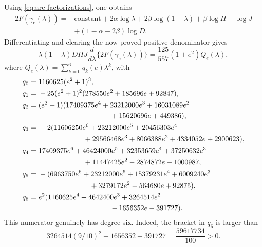 \documentclass[11pt,reqno,letterpaper]{amsart}
\numberwithin{equation}{section}
\theoremstyle{definition}
\theoremstyle{remark}
\begin{document}
Using \eqref{eq:arc-factorizations}, one obtains
\[
 \begin{split}
 2F(\gamma_e(\lambda))={}&\text{constant}
 +2\alpha\log\lambda+2\beta\log(1-\lambda)
 +\beta\log H-\log J\\
 &+(1-\alpha-2\beta)\log D.
 \end{split}
\]
Differentiating and clearing the now-proved positive denominator gives
\begin{equation}\label{eq:exact-phase-derivative}
 \lambda(1-\lambda)DHJ
 \frac d{d\lambda}\{2F(\gamma_e(\lambda))\}
 =\frac{125}{557}(1+e^2)Q_e(\lambda),
\end{equation}
where \(Q_e(\lambda)=\sum_{k=0}^6q_k(e)\lambda^k\), with
\begin{align*}
 q_0={}&1160625(e^2+1)^3,\\
 q_1={}&-25(e^2+1)^2(278550e^2+185696e+92847),\\
 q_2={}&(e^2+1)(17409375e^4+23212000e^3+16031089e^2\\
 &\hspace{35mm}+15620696e+449386),\\
 q_3={}&-2(11606250e^6+23212000e^5+20456303e^4\\
 &\hspace{22mm}+29566468e^3+8066388e^2+4334052e+2900623),\\
 q_4={}&17409375e^6+46424000e^5+32353659e^4+37250632e^3\\
 &\hspace{22mm}+11447425e^2-2874872e-1000987,\\
 q_5={}&-(6963750e^6+23212000e^5+15379231e^4+6009240e^3\\
 &\hspace{25mm}+3279172e^2-564680e+92875),\\
 q_6={}&e^2(1160625e^4+4642400e^3+3264514e^2\\
 &\hspace{35mm}-1656352e-391727).
\end{align*}
This numerator genuinely has degree six.  Indeed, the bracket in \(q_6\)
is larger than
\[
 3264514(9/10)^2-1656352-391727
 =\frac{59617734}{100}>0.
\]
\end{document}
